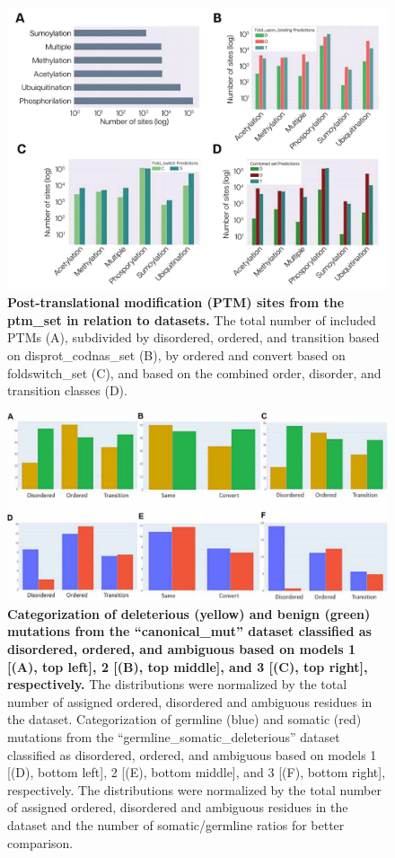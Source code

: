 \begin{figure}[tbh]
    \centering
    \includegraphics[width=\linewidth]{ambiguous//figures_ambiguous/fig8_corrected.pdf}
    \caption{\textbf{Post-translational modification (PTM) sites from the ptm_set in relation to datasets.} The total number of included PTMs (A), subdivided by disordered, ordered, and transition based on disprot_codnas_set (B), by ordered and convert based on foldswitch_set (C), and based on the combined order, disorder, and transition classes (D).}
    \label{fig:chapter5:fig8}
\end{figure}

\begin{figure}[tbh]
    \centering
    \includegraphics[width=\linewidth]{ambiguous//figures_ambiguous/fig9.pdf}
    \caption{\textbf{Categorization of deleterious (yellow) and benign (green) mutations from the “canonical_mut” dataset classified as disordered, ordered, and ambiguous based on models 1 [(A), top left], 2 [(B), top middle], and 3 [(C), top right], respectively.} The distributions were normalized by the total number of assigned ordered, disordered and ambiguous residues in the dataset. Categorization of germline (blue) and somatic (red) mutations from the “germline_somatic_deleterious” dataset classified as disordered, ordered, and ambiguous based on models 1 [(D), bottom left], 2 [(E), bottom middle], and 3 [(F), bottom right], respectively. The distributions were normalized by the total number of assigned ordered, disordered and ambiguous residues in the dataset and the number of somatic/germline ratios for better comparison.}
    \label{fig:chapter5:fig9}
\end{figure}

